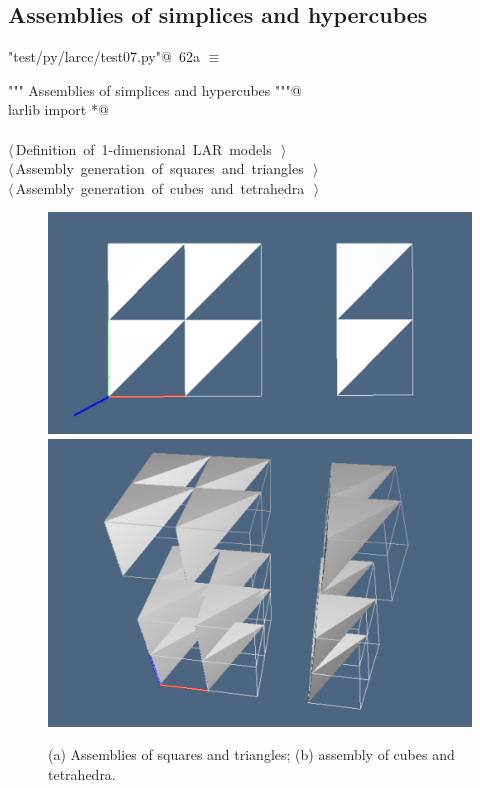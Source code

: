 \documentclass[11pt,oneside]{article}    %
\begin{document}
\subsection{Assemblies of simplices and hypercubes}

\begin{flushleft} \small \label{scrap118}
\protect{}\verb@"test/py/larcc/test07.py"@\nobreak\ {\footnotesize 62a }$\equiv$
\vspace{-1ex}
\begin{list}{}{} \item
\mbox{}\verb@""" Assemblies of simplices and hypercubes """@\\
\mbox{}\verb@from larlib import *@\\
\mbox{}\verb@@\\
\mbox{}\verb@@\hbox{$\langle\,$Definition of 1-dimensional LAR models\nobreak\ {\footnotesize {}}$\,\rangle$}\verb@@\\
\mbox{}\verb@@\hbox{$\langle\,$Assembly generation of squares and triangles\nobreak\ {\footnotesize {}}$\,\rangle$}\verb@@\\
\mbox{}\verb@@\hbox{$\langle\,$Assembly generation of cubes and tetrahedra\nobreak\ {\footnotesize {}}$\,\rangle$}\verb@@\\
\mbox{}\verb@@{\NWsep}
\end{list}
\vspace{-2ex}
\end{flushleft}

\begin{figure}[htbp] %
   \centering
   \includegraphics[width=0.405\linewidth]{images/assembly1} 
   \includegraphics[width=0.315\linewidth]{images/assembly2} 
   \caption{(a) Assemblies of squares and triangles; (b) assembly of cubes and tetrahedra.}
   \label{fig:example}
\end{figure}
\end{document}
